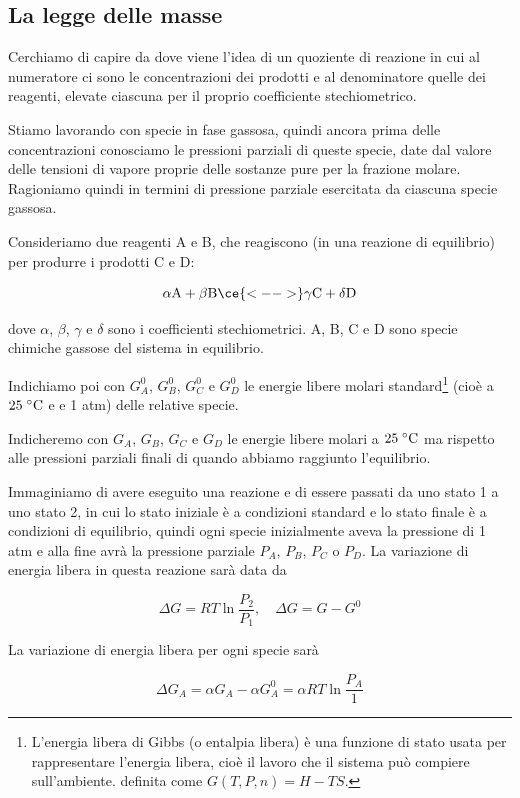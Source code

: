 \subsection{La legge delle masse}
Cerchiamo di capire da dove viene l'idea di un quoziente di reazione in cui al numeratore ci sono le concentrazioni dei prodotti e al denominatore quelle dei reagenti, elevate ciascuna per il proprio coefficiente stechiometrico.

Stiamo lavorando con specie in fase gassosa, quindi ancora prima delle concentrazioni conosciamo le pressioni parziali di queste specie, date dal valore delle tensioni di vapore proprie delle sostanze pure per la frazione molare. Ragioniamo quindi in termini di pressione parziale esercitata da ciascuna specie gassosa.

Consideriamo due reagenti A e B, che reagiscono (in una reazione di equilibrio) per produrre i prodotti C e D:

$$\rm \alpha A + \beta B \ce{<-->} \gamma C + \delta D$$

dove $\alpha$, $\beta$, $\gamma$ e $\delta$ sono i coefficienti stechiometrici. A, B, C e D sono specie chimiche gassose del sistema in equilibrio.

Indichiamo poi con $G_A^0$, $G_B^0$, $G_C^0$ e $G_D^0$ le energie libere molari standard\footnote{L'energia libera di Gibbs (o entalpia libera) è una funzione di stato usata per rappresentare l'energia libera, cioè il lavoro che il sistema può compiere sull'ambiente. \E definita come $G(T,P,n)=H-TS$.} (cioè a $25 \; ^{\circ} \rm C$ e e 1 atm) delle relative specie.

Indicheremo con $G_A$, $G_B$, $G_C$ e $G_D$ le energie libere molari a $25 \; ^{\circ} \rm C$ ma rispetto alle pressioni parziali finali di quando abbiamo raggiunto l'equilibrio.

Immaginiamo di avere eseguito una reazione e di essere passati da uno stato 1 a uno stato 2, in cui lo stato iniziale è a condizioni standard e lo stato finale è a condizioni di equilibrio, quindi ogni specie inizialmente aveva la pressione di 1 atm e alla fine avrà la pressione parziale $P_A$, $P_B$, $P_C$ o $P_D$. La variazione di energia libera in questa reazione sarà data da

$$\Delta G = RT \ln \frac{P_2}{P_1}, \quad \Delta G = G - G^0$$

La variazione di energia libera per ogni specie sarà

$$\Delta G_A = \alpha G_A - \alpha G_A^0 = \alpha RT \ln \frac{P_A}{1}$$

